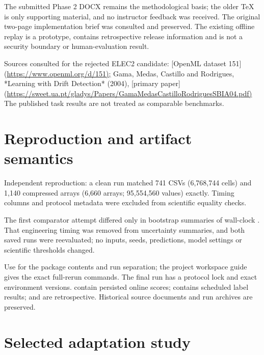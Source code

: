 \documentclass[11pt,a4paper]{article}
\begin{document}
The submitted Phase 2 DOCX remains the methodological basis; the older TeX is only supporting material, and no instructor feedback was received. The original two-page implementation brief was consulted and preserved. The existing offline replay is a prototype, contains retrospective release information and is not a security boundary or human-evaluation result.\par

Sources consulted for the rejected ELEC2 candidate: [OpenML dataset 151](\url{https://www.openml.org/d/151);} Gama, Medas, Castillo and Rodrigues, *Learning with Drift Detection* (2004), [primary paper](\url{https://sweet.ua.pt/gladys/Papers/GamaMedasCastilloRodriguesSBIA04.pdf)} The published task results are not treated as comparable benchmarks.\par

\section{Reproduction and artifact semantics}

Independent reproduction: a clean run matched 741 CSVs (6,768,744 cells) and 1,140 compressed arrays (6,660 arrays; 95,554,560 values) exactly. Timing columns and protocol metadata were excluded from scientific equality checks.\par
The first comparator attempt differed only in bootstrap summaries of wall-clock \texttt{}. That engineering timing was removed from uncertainty summaries, and both saved runs were reevaluated; no inputs, seeds, predictions, model settings or scientific thresholds changed.\par

Use \texttt{} for the package contents and run separation; the project workspace guide \texttt{} gives the exact full-rerun commands. The final run has a protocol lock and exact environment versions. \texttt{} contain persisted online scores; \texttt{} contains scheduled label results; \texttt{} and \texttt{} are retrospective. Historical source documents and run archives are preserved.\par


\section{Selected adaptation study}
\end{document}
